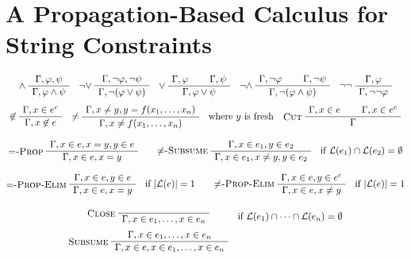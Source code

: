 
\section{A Propagation-Based Calculus for String Constraints}
\label{sect:calculus}

\begin{table}
  \caption{Rules of the one-sided sequent calculus. A term
    $e^c$ denotes the complement of a regular expression~$e$,  i.e.,
    ~$\lang{e^c} = \Sigma^* \setminus \lang{e}$.}
  \label{tab:calculus}
  
  \begin{gather*}
    \infer[$\wedge$]
    {\seqq{\varphi \wedge \psi}}
    {\seqq{\varphi, \psi}}
    \quad
    \infer[$\neg\vee$]
    {\seqq{ \neg(\varphi \vee \psi)}}
    {\seqq{ \neg\varphi, \neg\psi}}
    \quad
    \inferii[$\vee$]
    {\seqq{\varphi \vee \psi}}
    {\seqq{\varphi}}{\seqq{\psi}}
    \quad
    \inferii[$\neg\wedge$]
    {\seqq{\neg(\varphi \wedge \psi)}}
    {\seqq{\neg\varphi}}{\seqq{\neg\psi}}
    \quad
    \infer[$\neg\neg$]
    {\seqq{ \neg\neg\varphi}}
    {\seqq{\varphi}}
    \\[1ex]
    \infer[$\not\in$]
    {\seqq{x \not\in e}}
    {\seqq{x \in e^c}}
    \quad
    \inferC[\ruleName{$\not=$}]{\text{where~} y \text{~is fresh}}
    {\seqq{x \not= f(x_1, \ldots, x_n)}}
    {\seqq{x \not= y, y = f(x_1, \ldots, x_n)}}
    \quad
    \inferii[Cut]
    {\seqq{}}
    {\seqq{x \in e}}{\seqq{x \in e^c}}
    \\[2ex]
    \infer[$=$-Prop]
    {\seqq{x \in e, x = y}}
    {\seqq{x \in e, x = y, y \in e}}
    \qquad
    \inferC[$\not=$-Subsume]{\text{if~} \lang{e_1} \cap \lang{e_2} = \emptyset}
    {\seqq{x \in e_1, x \not= y, y \in e_2}}
    {\seqq{x \in e_1, y \in e_2}}
    \\[2ex]
    \inferC[$=$-Prop-Elim]{\text{if~} |\lang{e}| = 1}
    {\seqq{x \in e, x = y}}
    {\seqq{x \in e, y \in e}}
    \qquad
    \inferC[$\not=$-Prop-Elim]{\text{if~} |\lang{e}| = 1}
    {\seqq{x \in e, x \not= y}}
    {\seqq{x \in e, y \in e^c}}
    \\[3ex]
    \begin{array}{@{}cl@{}}
      \infer[Close]
      {\seqq{x \in e_1, \ldots, x \in e_n}}
      {}
      &
        \text{if~} \lang{e_1} \cap \cdots \cap\lang{e_n} = \emptyset
      \\[2ex]
      \infer[Subsume]
      {\seqq{x \in e, x \in e_1, \ldots, x \in e_n}}
      {\seqq{x \in e_1, \ldots, x \in e_n}}

\end{array}
\end{gather*}
\end{table}
